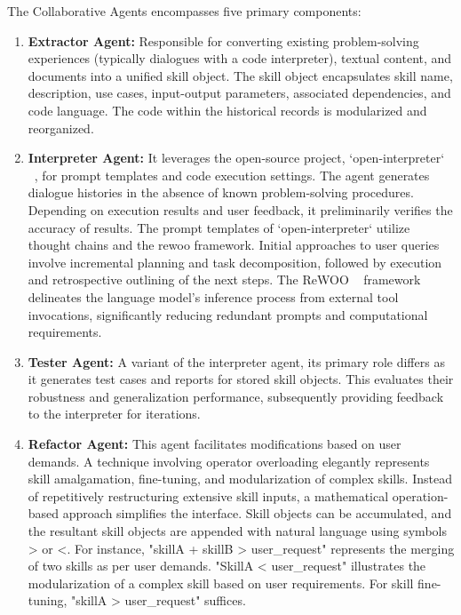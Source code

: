 The Collaborative Agents encompasses five primary components:

\begin{enumerate}
    \item \textbf{Extractor Agent:} Responsible for converting existing problem-solving experiences (typically dialogues with a code interpreter), textual content, and documents into a unified skill object. The skill object encapsulates skill name, description, use cases, input-output parameters, associated dependencies, and code language. The code within the historical records is modularized and reorganized.
    
    \item \textbf{Interpreter Agent:} It leverages the open-source project, `open-interpreter` ~\cite{openinterpreter}, for prompt templates and code execution settings. The agent generates dialogue histories in the absence of known problem-solving procedures. Depending on execution results and user feedback, it preliminarily verifies the accuracy of results. The prompt templates of `open-interpreter` utilize thought chains and the rewoo framework. Initial approaches to user queries involve incremental planning and task decomposition, followed by execution and retrospective outlining of the next steps. The ReWOO ~\cite{xu2023rewoo} framework delineates the language model's inference process from external tool invocations, significantly reducing redundant prompts and computational requirements.
    
    \item \textbf{Tester Agent:} A variant of the interpreter agent, its primary role differs as it generates test cases and reports for stored skill objects. This evaluates their robustness and generalization performance, subsequently providing feedback to the interpreter for iterations.
    
    \item \textbf{Refactor Agent:} This agent facilitates modifications based on user demands. A technique involving operator overloading elegantly represents skill amalgamation, fine-tuning, and modularization of complex skills. Instead of repetitively restructuring extensive skill inputs, a mathematical operation-based approach simplifies the interface. Skill objects can be accumulated, and the resultant skill objects are appended with natural language using symbols > or <. For instance, "skillA + skillB > user\_request" represents the merging of two skills as per user demands. "SkillA < user\_request" illustrates the modularization of a complex skill based on user requirements. For skill fine-tuning, "skillA > user\_request" suffices.
    

\end{enumerate}
